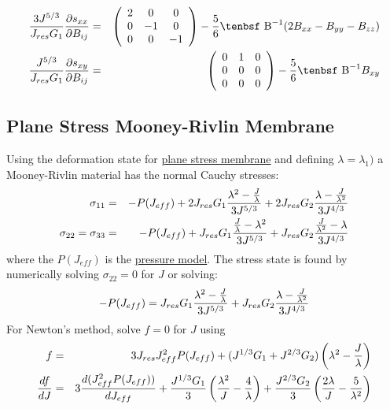 \documentclass[11pt]{book}
\def\B{\hbox{\tenbsf B}}
\def\Jeff{J_{eff}}
\def\Jres{J_{res}}
\begin{document}
\begin{eqnarray}
       {3J^{5/3}\over \Jres G_1}{\partial s_{xx}\over\partial B_{ij}} & = & \left(\begin{array}{ccc} 2 & 0 & 0 \\ 0 & -1 & 0 \\ 0 & 0 & -1\end{array}\right)
                                    - {5\over6}\B^{-1}(2B_{xx}-B_{yy} - B_{zz})  \\
       {J^{5/3}\over \Jres G_1}{\partial s_{xy}\over\partial B_{ij}} & = & \left(\begin{array}{ccc} 0 & 1 & 0 \\ 0 & 0 & 0 \\ 0 & 0 & 0\end{array}\right)
                                    - {5\over6}\B^{-1}B_{xy}
 \end{eqnarray}
\subsection{Plane Stress Mooney-Rivlin Membrane}

Using the deformation state for \hyperref[MMT]{plane stress membrane} and defining $\lambda=\lambda_1)$ a Mooney-Rivlin material has the normal Cauchy stresses:
\begin{eqnarray}
      \sigma_{11} & = & -P(\Jeff) + 2\Jres G_1{\lambda^2-{J\over\lambda}\over 3J^{5/3}} + 2\Jres G_2{\lambda-{J\over\lambda^2}\over 3J^{4/3}} \\
      \sigma_{22} = \sigma_{33} & = & -P(\Jeff) +  \Jres G_1{{J\over\lambda}-\lambda^2\over 3J^{5/3}} + \Jres G_2{{J\over\lambda^2}-\lambda\over 3J^{4/3}}
\end{eqnarray}
where the $P(\Jeff)$ is the \hyperref[PTerms]{pressure model}. The stress state is found by numerically solving $\sigma_{22}=0$ for $J$ or solving:
\begin{equation}
	-P(\Jeff) =  \Jres G_1{\lambda^2-{J\over\lambda}\over 3J^{5/3}} + \Jres G_2{\lambda-{J\over\lambda^2}\over 3J^{4/3}}
\end{equation}
For Newton's method, solve $f=0$ for $J$ using
\begin{eqnarray}
	f & = & 3\Jres \Jeff^2 P(\Jeff) + (J^{1/3}G_1+J^{2/3}G_2)\left(\lambda^2-{J\over\lambda}\right) \\
	{df\over dJ} & = & 3 {d(\Jeff^2 P(\Jeff))\over d\Jeff} + {J^{1/3}G_1\over 3}\left({\lambda^2\over J}-{4\over\lambda}\right)
	+ {J^{2/3}G_2\over 3}\left({2\lambda\over J}-{5\over\lambda^2}\right)
\end{eqnarray}
\end{document}
